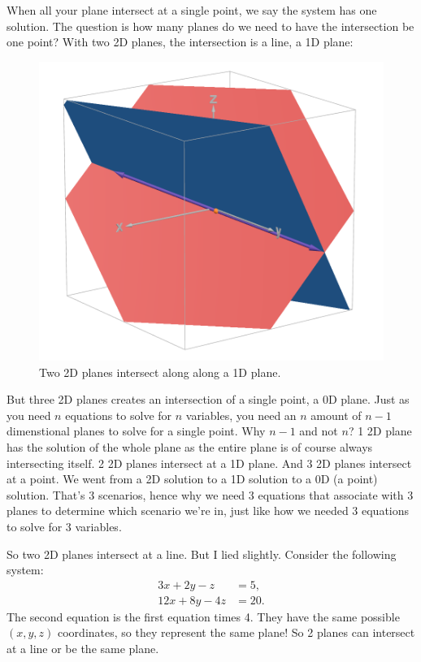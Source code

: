\documentclass[12pt]{scrartcl}
\begin{document}
When all your plane intersect at a single point, we say the system has one solution. The question is how many planes do we need to have the intersection be one point? With two 2D planes, the intersection is a line, a 1D plane:
\begin{figure}[H]
    \centering
    \includegraphics[scale=0.4]{Intercept of Two Planes.png}
    \caption*{Two 2D planes intersect along along a 1D plane.}
\end{figure}
But three 2D planes creates an intersection of a single point, a 0D plane. Just as you need $n$ equations to solve for $n$ variables, you need an $n$ amount of $n-1$ dimenstional planes to solve for a single point. Why $n-1$ and not $n$? 1 2D plane has the solution of the whole plane as the entire plane is of course always intersecting itself. 2 2D planes intersect at a 1D plane. And 3 2D planes intersect at a point. We went from a 2D solution to a 1D solution to a 0D (a point) solution. That's 3 scenarios, hence why we need 3 equations that associate with 3 planes to determine which scenario we're in, just like how we needed 3 equations to solve for 3 variables.

So two 2D planes intersect at a line. But I lied slightly. Consider the following system:
\begin{align*}
    3x + 2y - z &= 5, \\
    12x + 8y - 4z &= 20.
\end{align*}
The second equation is the first equation times 4. They have the same possible $(x,y,z)$ coordinates, so they represent the same plane! So 2 planes can intersect at a line or be the same plane.
\end{document}
